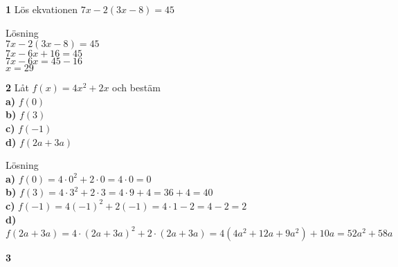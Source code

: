 \documentclass{article}
\begin{document}
\textbf{1} Lös ekvationen $7x-2(3x-8)=45$

Lösning\\
$7x-2(3x-8)=45$\\
$7x-6x+16=45$\\
$7x-6x=45-16$\\
$x=29$

\textbf{2} Låt $f(x)=4x^{2}+2x$ och bestäm\\
\textbf{a)} $f(0)$\\
\textbf{b)} $f(3)$\\
\textbf{c)} $f(-1)$\\
\textbf{d)} $f(2a + 3a)$

Lösning\\
\textbf{a)} $f(0)=4\cdot0^2+2\cdot0=4\cdot0=0$\\
\textbf{b)} $f(3)=4\cdot3^2+2\cdot3=4\cdot9+4=36+4=40$\\
\textbf{c)} $f(-1)=4(-1)^2+2(-1)=4\cdot1-2=4-2=2$\\
\textbf{d)} $f(2a+3a)=4\cdot(2a+3a)^2+2\cdot(2a+3a)=4(4a^2+12a+9a^2)+10a=52a^2+58a$

\textbf{3}
\end{document}
